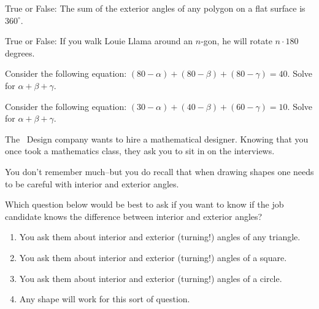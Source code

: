 \documentclass[noauthor,nooutcomes]{ximera}
\author{Claire Merriman and Bart Snapp}
\begin{document}
\maketitle

\begin{exercise}
  True or False:
 The sum of the exterior angles of any polygon on a flat surface is $360^\circ$.
\end{exercise}

\begin{exercise}
  True or False: If you walk Louie Llama around an $n$-gon, he will
  rotate $n\cdot 180$ degrees.
\end{exercise}




\begin{exercise}
 Consider the following equation: $(80-\alpha)+(80-\beta)+(80-\gamma)=40$. Solve for $\alpha+\beta+\gamma$.
\end{exercise}



\begin{exercise}
 Consider the following equation: $(30-\alpha)+(40-\beta)+(60-\gamma)=10$. Solve for $\alpha+\beta+\gamma$.
\end{exercise}


\begin{exercise}
The \mooculus~Design company wants to hire a mathematical
designer. Knowing that you once took a mathematics class, they ask you
to sit in on the interviews.


You don't remember much--but you do recall that when drawing shapes
one needs to be careful with interior and exterior angles.

 

Which question below would be best to ask if you want to know if the
job candidate knows the difference between interior and exterior
angles?

\begin{enumerate}
\item You ask them about interior and exterior (turning!)  angles of
  any triangle.
\item You ask them about interior and exterior (turning!) angles of a square.
\item You ask them about interior and exterior (turning!)  angles of a circle.
\item Any shape will work for this sort of question.
\end{enumerate}

\end{exercise}






\end{document}
